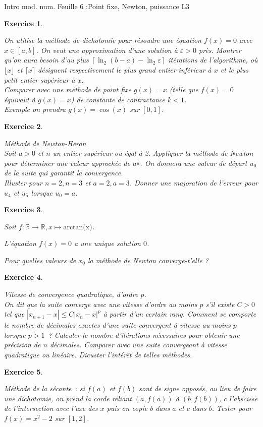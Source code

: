 \documentclass[10pt,a4paper]{article}
\newcommand{\R}{\mathbb R}
\newtheorem{exer}{Exercice}
\def\bexer{\begin{exer}\begin{em}}\def\eexer{\end{em}\end{exer}}
\begin{document}
\noindent Intro mod. num. \hfill Feuille 6 :Point fixe, Newton, puissance \hfill {L3 \the\year}\\

\bexer
On utilise la m\'ethode de dichotomie pour r\'esoudre une \'equation
$f(x)=0$ avec $x\in[a,b]$. On veut une approximation d'une solution
\`a $\varepsilon>0$ pr\`es. Montrer qu'on aura besoin d'au plus
$\left\lceil \ln_2(b-a)-\ln_2\varepsilon \right\rceil$  it\'erations
de l'algorithme, o\`u $\lfloor x\rfloor$ et $\lceil x \rceil$
d\'esignent respectivement le plus grand entier inf\'erieur \`a $x$ et
le plus petit entier sup\'erieur \`a $x$. \\
Comparer avec
une m\'ethode de point fixe $g(x)=x$ (telle que $f(x)=0 $ \'equivaut
\`a $g(x)=x$) de constante de contractance $k<1$.\\
Exemple on prendra $g(x)=\cos(x)$ sur $[0,1]$.
\eexer

\bexer Méthode de Newton-Heron\\
Soit $a>0$ et $n$ un entier supérieur ou égal à 2. Appliquer la
m\'ethode de Newton pour d\'eterminer une valeur approch\'ee
de $a^{\frac{1}{n}}$. On donnera une valeur de d\'epart $u_0$
de la suite qui garantit la convergence.\\
Illuster pour $n=2, n=3$ et $a=2, a=3$.
Donner une majoration de l'erreur pour $u_4$ et $u_5$ lorsque $u_0=a$.
\eexer

\bexer

Soit $f:\R\rightarrow\R, x\mapsto \mbox{arctan(x)}$.

L'équation $f(x)=0$ a une unique solution $0$.

Pour quelles valeurs de $x_0$ la méthode de Newton converge-t'elle ?
\eexer

\bexer Vitesse de convergence quadratique, d'ordre $p$.\\
On dit que la suite converge avec une {\it vitesse d'ordre au moins
  $p$}  s'il existe $C>0$ tel que ${|x_{n+1}-x|}\leq C{|x_{n}-x|^p}$
\`a partir d'un certain rang.
Comment se comporte le nombre de d\'ecimales exactes d'une suite
convergent \`a vitesse au moins $p$ lorsque $p>1$~?  Calculer le
nombre d'it\'erations n\'ecessaires pour obtenir une pr\'ecision de
$n$ d\'ecimales. Comparer avec une suite convergeant \`a vitesse
quadratique ou lin\'eaire. Dicuster l'int\'er\^et de telles m\'ethodes.
\eexer

\bexer M\'ethode de la s\'ecante~: si $f(a)$ et $f(b)$ sont
de signe oppos\'es, au lieu de faire une dichotomie, on prend
la corde reliant $(a,f(a))$ \`a $(b,f(b))$, $c$ l'abscisse de
l'intersection avec l'axe des $x$ puis on copie $b$ dans $a$ et $c$
dans $b$. Tester pour $f(x)=x^2-2$ sur $[1,2]$.
\eexer
\end{document}
